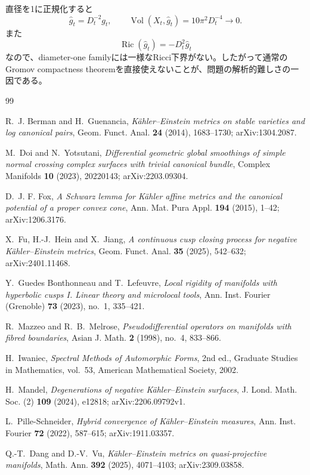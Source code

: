 \documentclass[11pt,a4paper]{ltjsarticle}
\theoremstyle{definition}
\theoremstyle{remark}
\newcommand{\Vol}{\operatorname{Vol}}
\newcommand{\Ric}{\operatorname{Ric}}
\begin{document}
直径を1に正規化すると
\[
 \widehat g_t=D_t^{-2}g_t,
 \qquad
 \Vol(X_t,\widehat g_t)=10\pi^2D_t^{-4}\to0.
\]
また
\[
 \Ric(\widehat g_t)=-D_t^2\widehat g_t
\]
なので、diameter-one familyには一様なRicci下界がない。したがって通常のGromov compactness theoremを直接使えないことが、問題の解析的難しさの一因である。

\begin{thebibliography}{99}

R.~J. Berman and H.~Guenancia,
\emph{Kähler--Einstein metrics on stable varieties and log canonical pairs},
Geom. Funct. Anal. \textbf{24} (2014), 1683--1730; arXiv:1304.2087.


M.~Doi and N.~Yotsutani,
\emph{Differential geometric global smoothings of simple normal crossing complex surfaces with trivial canonical bundle},
Complex Manifolds \textbf{10} (2023), 20220143; arXiv:2203.09304.

D.~J. F. Fox,
\emph{A Schwarz lemma for Kähler affine metrics and the canonical potential of a proper convex cone},
Ann. Mat. Pura Appl. \textbf{194} (2015), 1--42; arXiv:1206.3176.

X.~Fu, H.-J.~Hein and X.~Jiang,
\emph{A continuous cusp closing process for negative Kähler--Einstein metrics},
Geom. Funct. Anal. \textbf{35} (2025), 542--632; arXiv:2401.11468.

Y.~Guedes Bonthonneau and T.~Lefeuvre,
\emph{Local rigidity of manifolds with hyperbolic cusps I. Linear theory and microlocal tools},
Ann. Inst. Fourier (Grenoble) \textbf{73} (2023), no.~1, 335--421.

R.~Mazzeo and R.~B.~Melrose,
\emph{Pseudodifferential operators on manifolds with fibred boundaries},
Asian J. Math. \textbf{2} (1998), no.~4, 833--866.

H.~Iwaniec,
\emph{Spectral Methods of Automorphic Forms}, 2nd ed.,
Graduate Studies in Mathematics, vol.~53, American Mathematical Society, 2002.

H.~Mandel,
\emph{Degenerations of negative Kähler--Einstein surfaces},
J. Lond. Math. Soc. (2) \textbf{109} (2024), e12818; arXiv:2206.09792v1.

L.~Pille-Schneider,
\emph{Hybrid convergence of Kähler--Einstein measures},
Ann. Inst. Fourier \textbf{72} (2022), 587--615; arXiv:1911.03357.

Q.-T.~Dang and D.-V.~Vu,
\emph{Kähler--Einstein metrics on quasi-projective manifolds},
Math. Ann. \textbf{392} (2025), 4071--4103; arXiv:2309.03858.


\end{thebibliography}
\end{document}
